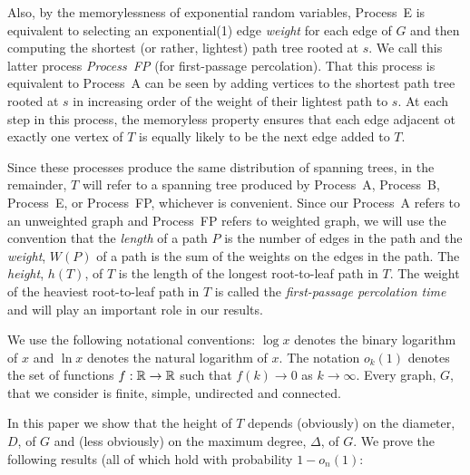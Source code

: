 \documentclass{patmorin}
\begin{document}
Also, by the memorylessness of exponential random variables, Process~E
is equivalent to selecting an exponential(1) edge \emph{weight} for
each edge of $G$ and then computing the shortest (or rather, lightest)
path tree rooted at $s$.  We call this latter process \emph{Process~FP}
(for first-passage percolation).  That this process is equivalent to
Process~A can be seen by adding vertices to the shortest path tree rooted
at $s$ in increasing order of the weight of their lightest path to $s$.
At each step in this process, the memoryless property ensures that each
edge adjacent ot exactly one vertex of $T$ is equally likely to be the
next edge added to $T$.

Since these processes produce the same distribution of spanning trees,
in the remainder, $T$ will refer to a spanning tree produced by Process~A,
Process~B, Process~E, or Process~FP, whichever is convenient.  Since our
Process~A refers to an unweighted graph and Process~FP refers to weighted
graph, we will use the convention that the \emph{length} of a path $P$ is
the number of edges in the path and the \emph{weight}, $W(P)$ of a path
is the sum of the weights on the edges in the path. The \emph{height},
$h(T)$, of $T$ is the length of the longest root-to-leaf path in $T$.
The weight of the heaviest root-to-leaf path in $T$ is called the
\emph{first-passage percolation time} and will play an important role
in our results.

We use the following notational conventions: $\log x$ denotes the binary
logarithm of $x$ and $\ln x$ denotes the natural logarithm of $x$.
The notation $o_k(1)$ denotes the set of functions $f:\mathbb{R}\to\mathbb{R}$ such
that $f(k)\to 0$ as $k\to\infty$.  Every graph, $G$, that we consider
is finite, simple, undirected and connected.

In this paper we show that the height of $T$ depends (obviously) on
the diameter, $D$, of $G$ and (less obviously) on the maximum degree,
$\Delta$, of $G$.  We prove the following results (all of which hold
with probability $1-o_n(1)$:
\end{document}
